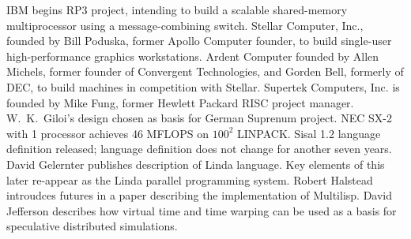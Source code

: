 	{IBM begins RP3 project,
	intending to build a scalable shared-memory multiprocessor
	using a message-combining switch.}
	{Stellar Computer, Inc., founded by Bill Poduska, former
	Apollo Computer founder, to build single-user high-performance
	graphics workstations.}
	{Ardent Computer founded by Allen Michels, former founder
	of Convergent Technologies, and Gorden Bell, formerly of DEC,
	to build machines in competition with Stellar.}
	{Supertek Computers, Inc. is founded by Mike Fung,
	former Hewlett Packard RISC project manager.}
	{W.~K.\ Giloi's design chosen as basis for German Suprenum project.}
	{NEC SX-2 with 1 processor achieves 46 MFLOPS
	on $100^2$ LINPACK.}
	{Sisal 1.2 language definition released;
	language definition does not change for another seven years.}
	{David Gelernter publishes description of Linda language.
	Key elements of this later re-appear as
	the Linda parallel programming system.}
	{Robert Halstead introudces futures
	in a paper describing the implementation of Multilisp.}
	{David Jefferson describes how virtual time and time warping
	can be used as a basis for speculative distributed simulations.}


